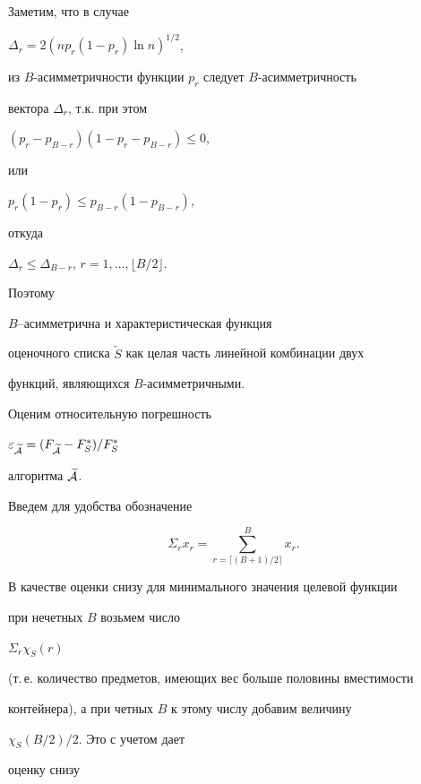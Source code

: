 \begin{pf}


Заметим, что в случае


$\Delta_{r}=2( np_{r}(1-p_{r})\ln n)^{1/2}$,


из $B$-асимметричности функции $p_{r}$ следует $B$-асимметричность


вектора $\Delta_{r}$, т.к. при этом


$(p_{r}-p_{B-r})(1-p_{r}-p_{B-r}) \le 0$,


или


$p_{r}(1-p_{r}) \le p_{B-r}(1-p_{B-r})$,


откуда


$\Delta_r \le \Delta_{B-r}$, $r=1,\dotsc,\lfloor B/2\rfloor$.


Поэтому


$B$--асимметрична и характеристическая функция 


оценочного списка $\widetilde {S}$ как целая часть линейной комбинации двух


функций, являющихся $B$-асимметричными.





Оценим относительную погрешность


$\varepsilon_{\widetilde{ \cal A}}=


(F_{\widetilde {\cal A}}-F_{S}^{\ast}) / F_{S}^{\ast}


$


алгоритма $\widetilde{ \cal A}$.


Введем для удобства обозначение


$$


\Sigma_{r}x_{r}=\sum_{r=\lceil {(B+1)/2} \rceil }^{B} x_{r}.


$$





В качестве оценки снизу для минимального значения целевой функции


при нечетных $B$ возьмем число


$\Sigma_{r}\chi_S(r)$


(т.\,е. количество предметов, имеющих вес больше половины вместимости


контейнера), а при четных $B$ к этому числу добавим величину


$\chi_S(B/2)/2$. Это с учетом  дает


оценку снизу


\begin{gather*}



\end{gather*}
\end{pf}
